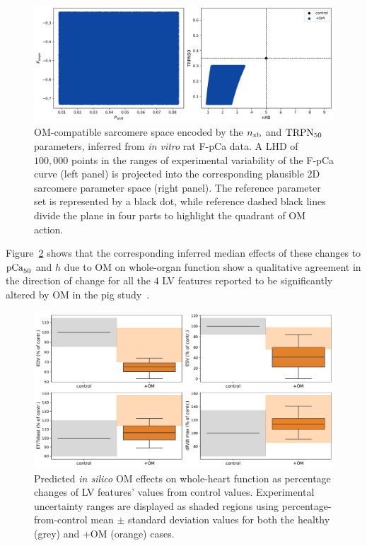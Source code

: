 \begin{figure}[ht!]
    \myfloatalign
    \includegraphics[width=\textwidth]{figures/chapter05/Fig3_bonus.png}
    \caption{OM-compatible sarcomere space encoded by the $n_{\textrm{xb}}$ and $\textrm{TRPN}_{50}$ parameters, inferred from \textit{in vitro} rat F-pCa data. A LHD of $100,000$ points in the ranges of experimental variability of the F-pCa curve (left panel) is projected into the corresponding plausible $2$D sarcomere parameter space (right panel). The reference parameter set is represented by a black dot, while reference dashed black lines divide the plane in four parts to highlight the quadrant of OM action.}
    \label{fig:deltas}
\end{figure}

\vspace{0.2cm}
Figure~\ref{fig:lvfeatsdistr} shows that the corresponding inferred median effects of these changes to $\textrm{pCa}_{50}$ and $h$ due to OM on whole-organ function show a qualitative agreement in the direction of change for all the $4$ LV features reported to be significantly altered by OM in the pig study~\cite{Bakkehaug:2015}.

\begin{figure}[ht!]
    \myfloatalign
    \includegraphics[width=\textwidth]{figures/chapter05/Fig3.pdf}
    \caption{Predicted \textit{in silico} OM effects on whole-heart function as percentage changes of LV features' values from control values. Experimental uncertainty ranges are displayed as shaded regions using percentage-from-control mean $\pm$ standard deviation values for both the healthy (grey) and $+$OM (orange) cases.}
    \label{fig:lvfeatsdistr}
\end{figure}


